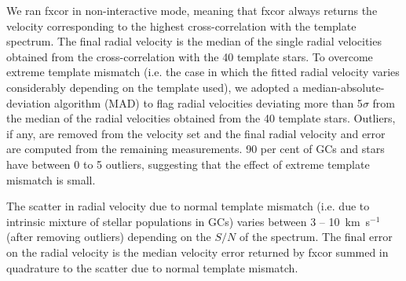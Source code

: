 \documentclass[useAMS,usenatbib]{mn2e}
\newcommand{\kms}{\mbox{\,km~s$^{-1}$}}
\begin{document}
We ran fxcor in non-interactive mode, meaning that fxcor always returns the velocity corresponding to the highest cross-correlation with the template spectrum. The final radial velocity is the median of the single radial velocities obtained from the cross-correlation with the 40 template stars. %
To overcome extreme template mismatch (i.e. the case in which the fitted radial velocity varies considerably depending on the template used), we adopted a median-absolute-deviation algorithm (MAD) to flag radial velocities deviating more than 5$\sigma$ from the median of the radial velocities obtained from the 40 template stars. Outliers, if any, are removed from the velocity set and the final radial velocity and error are computed from the remaining measurements. 90 per cent of GCs and stars have between 0 to 5 outliers, suggesting that the effect of extreme template mismatch is small. 

The scatter in radial velocity due to normal template mismatch (i.e. due to intrinsic mixture of stellar populations in GCs) varies between 3 -- 10 \kms (after removing outliers) depending on the $S/N$ of the spectrum. The final error on the radial velocity is the median velocity error returned by fxcor summed in quadrature to the scatter due to normal template mismatch. 
\end{document}
